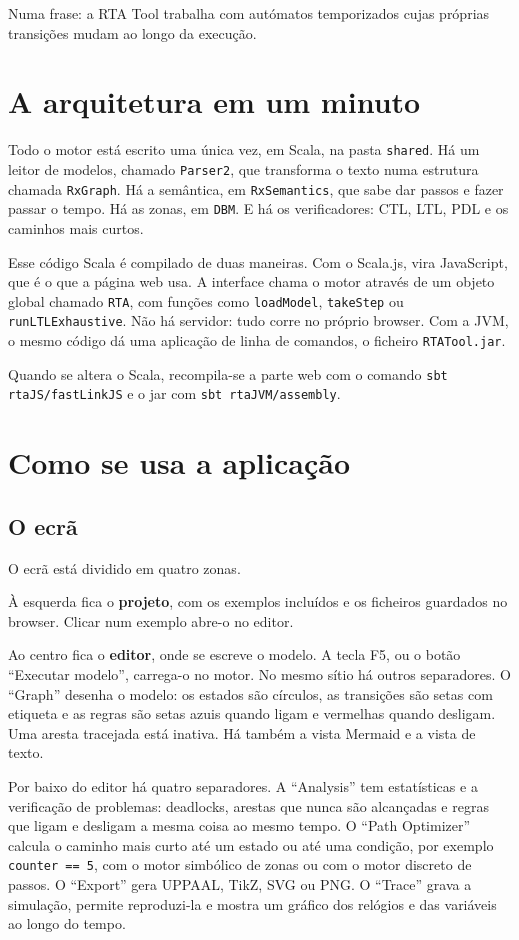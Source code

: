 \documentclass[11pt,a4paper]{article}
\newcommand{\code}[1]{\texttt{#1}}
\begin{document}
Numa frase: a RTA Tool trabalha com autómatos temporizados cujas próprias transições mudam ao longo da execução.

\section{A arquitetura em um minuto}

Todo o motor está escrito uma única vez, em Scala, na pasta \code{shared}. Há um leitor de modelos, chamado \code{Parser2}, que transforma o texto numa estrutura chamada \code{RxGraph}. Há a semântica, em \code{RxSemantics}, que sabe dar passos e fazer passar o tempo. Há as zonas, em \code{DBM}. E há os verificadores: CTL, LTL, PDL e os caminhos mais curtos.

Esse código Scala é compilado de duas maneiras. Com o Scala.js, vira JavaScript, que é o que a página web usa. A interface chama o motor através de um objeto global chamado \code{RTA}, com funções como \code{loadModel}, \code{takeStep} ou \code{runLTLExhaustive}. Não há servidor: tudo corre no próprio browser. Com a JVM, o mesmo código dá uma aplicação de linha de comandos, o ficheiro \code{RTATool.jar}.

Quando se altera o Scala, recompila-se a parte web com o comando \code{sbt rtaJS/fastLinkJS} e o jar com \code{sbt rtaJVM/assembly}.

\section{Como se usa a aplicação}

\subsection{O ecrã}

O ecrã está dividido em quatro zonas.

À esquerda fica o \textbf{projeto}, com os exemplos incluídos e os ficheiros guardados no browser. Clicar num exemplo abre-o no editor.

Ao centro fica o \textbf{editor}, onde se escreve o modelo. A tecla F5, ou o botão ``Executar modelo'', carrega-o no motor. No mesmo sítio há outros separadores. O ``Graph'' desenha o modelo: os estados são círculos, as transições são setas com etiqueta e as regras são setas azuis quando ligam e vermelhas quando desligam. Uma aresta tracejada está inativa. Há também a vista Mermaid e a vista de texto.

Por baixo do editor há quatro separadores. A ``Analysis'' tem estatísticas e a verificação de problemas: deadlocks, arestas que nunca são alcançadas e regras que ligam e desligam a mesma coisa ao mesmo tempo. O ``Path Optimizer'' calcula o caminho mais curto até um estado ou até uma condição, por exemplo \code{counter == 5}, com o motor simbólico de zonas ou com o motor discreto de passos. O ``Export'' gera UPPAAL, TikZ, SVG ou PNG. O ``Trace'' grava a simulação, permite reproduzi-la e mostra um gráfico dos relógios e das variáveis ao longo do tempo.
\end{document}
